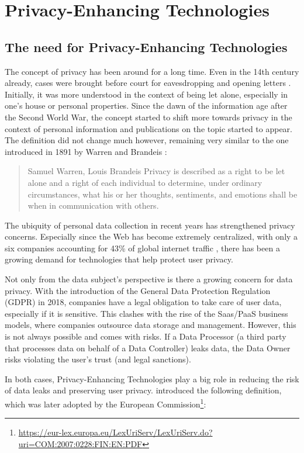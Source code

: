 \section{Privacy-Enhancing Technologies}
\subsection{The need for Privacy-Enhancing Technologies}
The concept of privacy has been around for a long time. Even in the 14th century already, cases were brought before court for eavesdropping and opening letters \citep{privacy-history}. Initially, it was more understood in the context of being let alone, especially in one's house or personal properties. Since the dawn of the information age after the Second World War, the concept started to shift more towards privacy in the context of personal information and publications on the topic started to appear. The definition did not change much however, remaining very similar to the one introduced in 1891 by Warren and Brandeis \citep{privacy-history}:
\begin{quote}{Samuel Warren, Louis Brandeis}
    Privacy is described as a right to be let alone and a right of each individual  to  determine,  under  ordinary  circumstances,  what  his  or  her  thoughts, sentiments, and emotions shall be when in communication with others.
\end{quote}
The ubiquity of personal data collection in recent years has strengthened privacy concerns. Especially since the Web has become extremely centralized, with only a six companies accounting for 43\% of global internet traffic \citep{internet-report}, there has been a growing demand for technologies that help protect user privacy.

Not only from the data subject's perspective is there a growing concern for data privacy. With the introduction of the General Data Protection Regulation (GDPR) in 2018, companies have a legal obligation to take care of user data, especially if it is sensitive. This clashes with the rise of the Saas/PaaS business models, where companies outsource data storage and management. However, this is not always possible and comes with risks. If a Data Processor (a third party that processes data on behalf of a Data Controller) leaks data, the Data Owner risks violating the user's trust (and legal sanctions). 

In both cases, Privacy-Enhancing Technologies play a big role in reducing the risk of data leaks and preserving user privacy. \citeauthor{pets-handbook} introduced the following definition, which was later adopted by the European Commission\footnote{\url{https://eur-lex.europa.eu/LexUriServ/LexUriServ.do?uri=COM:2007:0228:FIN:EN:PDF}}:


